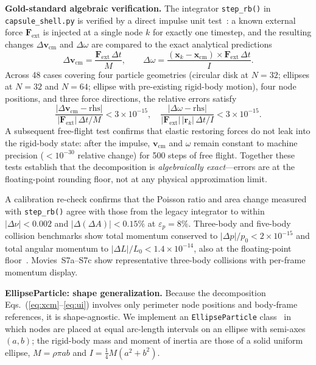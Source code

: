 \documentclass[aps,pre,twocolumn,floatfix,longbibliography]{revtex4-2}
\begin{document}
\textbf{Gold-standard algebraic verification.}
The integrator \texttt{step\_rb()} in \texttt{capsule\_shell.py} is verified
by a direct impulse unit test~\cite{directimpulse_code}: a known external force
$\mathbf{F}_\text{ext}$ is injected at a single node $k$ for exactly one
timestep, and the resulting changes $\Delta\mathbf{v}_\text{cm}$ and
$\Delta\omega$ are compared to the exact analytical predictions
\begin{equation}
  \Delta\mathbf{v}_\text{cm} = \frac{\mathbf{F}_\text{ext}\,\Delta t}{M},
  \qquad
  \Delta\omega = \frac{(\mathbf{x}_k - \mathbf{x}_\text{cm})
    \times \mathbf{F}_\text{ext}\,\Delta t}{I}.
\label{eq:impulse}
\end{equation}
Across 48 cases covering four particle geometries (circular disk at $N = 32$;
ellipses at $N = 32$ and $N = 64$; ellipse with pre-existing rigid-body motion),
four node positions, and three force directions, the relative errors satisfy
\begin{equation}
  \frac{|\Delta\mathbf{v}_\text{cm} - \text{rhs}|}{|\mathbf{F}_\text{ext}|\,\Delta t/M}
  < 3 \times 10^{-15},
  \quad
  \frac{|\Delta\omega - \text{rhs}|}{|\mathbf{F}_\text{ext}|\,|\mathbf{r}_k|\,\Delta t/I}
  < 3 \times 10^{-15}.
\label{eq:impulse_err}
\end{equation}
A subsequent free-flight test confirms that elastic restoring forces do not
leak into the rigid-body state: after the impulse, $\mathbf{v}_\text{cm}$ and
$\omega$ remain constant to machine precision ($< 10^{-30}$ relative change)
for 500 steps of free flight.  Together these tests establish that the
decomposition is \emph{algebraically exact}---errors are at the floating-point
rounding floor, not at any physical approximation limit.

A calibration re-check confirms that the Poisson ratio and area change
measured with \texttt{step\_rb()} agree with those from the legacy
integrator to within $|\Delta\nu| < 0.002$ and $|\Delta(\Delta A)| < 0.15\%$
at $\varepsilon_p = 8\%$.  Three-body and five-body collision benchmarks
show total momentum conserved to $|\Delta p|/p_0 < 2 \times 10^{-15}$ and
total angular momentum to $|\Delta L|/L_0 < 1.4 \times 10^{-14}$, also at
the floating-point floor~\cite{extension_code}.  Movies~S7a--S7c show
representative three-body collisions with per-frame momentum display.

\textbf{EllipseParticle: shape generalization.}
Because the decomposition Eqs.~(\ref{eq:xcm}--\ref{eq:ui}) involves only
perimeter node positions and body-frame references, it is shape-agnostic.
We implement an \texttt{EllipseParticle} class~\cite{ellipse_code} in which
nodes are placed at equal arc-length intervals on an ellipse with semi-axes
$(a, b)$; the rigid-body mass and moment of inertia are those of a solid
uniform ellipse, $M = \rho\pi ab$ and $I = \tfrac{1}{4}M(a^2 + b^2)$.
\end{document}
